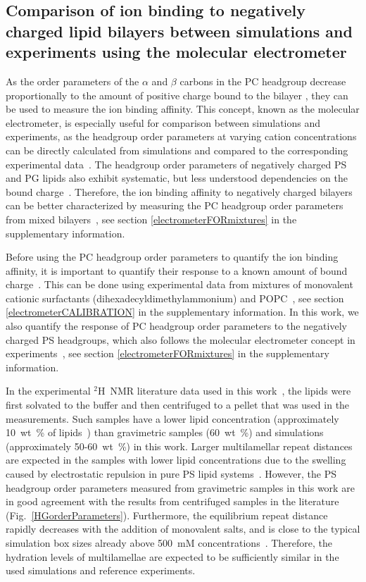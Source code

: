 \documentclass[aps,prl,superscriptaddress,twocolumn]{revtex4}
\begin{document}
\subsection{Comparison of ion binding to negatively charged lipid bilayers 
between simulations and experiments using the molecular electrometer}

As the order parameters of the $\alpha$ and $\beta$ carbons in the PC headgroup
decrease proportionally to the amount of positive
charge bound to the bilayer \cite{akutsu81,altenbach84,seelig87},
they can be used to measure the ion binding affinity.
This concept, known as the molecular electrometer, is especially useful for 
comparison between simulations and experiments, as
the headgroup order parameters at varying cation
concentrations can be directly calculated from 
simulations and compared to the corresponding experimental data~\cite{catte16}. The headgroup order parameters
of negatively charged PS and PG lipids also exhibit systematic, but less
understood dependencies on the bound charge~\cite{borle85,macdonald87,roux86,roux90}.
Therefore, the ion binding affinity to negatively charged bilayers
can be better characterized by measuring the PC headgroup order parameters from 
mixed bilayers~\cite{roux86,roux90,roux91}, see section \ref{electrometerFORmixtures} in the supplementary information.

Before using the PC headgroup order parameters to quantify the ion binding
affinity, it is important to quantify their response to a known amount of bound charge~\cite{catte16,melcr18}.
This can be done using experimental data from mixtures of
monovalent cationic surfactants (dihexadecyldimethylammonium) and POPC~\cite{scherer89,melcr18},
see section \ref{electrometerCALIBRATION} in the supplementary information.
In this work, we also quantify the response of PC headgroup order parameters
to the negatively charged PS headgroups, which also follows the molecular electrometer
concept in experiments~\cite{scherer87},
see section \ref{electrometerFORmixtures} in the supplementary information.

In the experimental $^2$H~NMR literature data used in this work~\cite{browning80,roux90},
the lipids were first solvated to the buffer and then centrifuged to a pellet that
was used in the measurements. Such samples have a lower lipid concentration
(approximately 10~wt~\% of lipids~\cite{browning80,roux88,roux90}) than 
gravimetric samples (60~wt~\%) and simulations (approximately 50-60~wt~\%) in this work.
Larger multilamellar repeat distances are expected in the samples with lower lipid
concentrations due to the swelling caused by electrostatic repulsion in pure PS lipid systems~\cite{millman82}.
However, the PS headgroup order parameters measured from gravimetric samples in this work
are in good agreement with the results from centrifuged samples in the literature~\cite{browning80} (Fig.~\ref{HGorderParameters}).
Furthermore, the equilibrium repeat distance rapidly decreases with the addition of monovalent
salts, and is close to the typical simulation box sizes already above 500~mM concentrations~\cite{millman82,rand89}.
Therefore, the hydration levels of multilamellae are expected to be sufficiently similar
in the used simulations and reference experiments.
\end{document}
